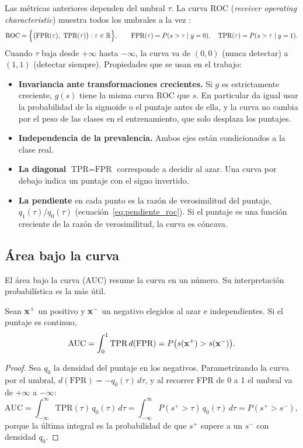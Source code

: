 Las métricas anteriores dependen del umbral $\tau$. La curva ROC (\emph{receiver operating characteristic}) muestra
todos los umbrales a la vez \parencite{fawcett2006}:
\begin{equation}
  \text{ROC} = \Big\{\big(\text{FPR}(\tau),\ \text{TPR}(\tau)\big) : \tau \in \R\Big\},
  \qquad
  \text{FPR}(\tau) = P(s > \tau \mid y = 0),\quad \text{TPR}(\tau) = P(s > \tau \mid y = 1).
\end{equation}
Cuando $\tau$ baja desde $+\infty$ hasta $-\infty$, la curva va de $(0,0)$ (nunca detectar) a $(1,1)$ (detectar
siempre). Propiedades que se usan en el trabajo:
\begin{itemize}
  \item \textbf{Invariancia ante transformaciones crecientes.} Si $g$ es estrictamente creciente, $g(s)$ tiene la misma
        curva ROC que $s$. En particular da igual usar la probabilidad de la sigmoide o el puntaje antes de ella, y
        la curva no cambia por el peso de las clases en el entrenamiento, que solo desplaza los puntajes.
  \item \textbf{Independencia de la prevalencia.} Ambos ejes están condicionados a la clase real.
  \item \textbf{La diagonal} $\text{TPR} = \text{FPR}$ corresponde a decidir al azar. Una curva por debajo indica un puntaje
        con el signo invertido.
  \item \textbf{La pendiente} en cada punto es la razón de verosimilitud del puntaje,
        $q_1(\tau)/q_0(\tau)$ (ecuación~\eqref{eq:pendiente_roc}). Si el puntaje es una función creciente de la razón de
        verosimilitud, la curva es cóncava.
\end{itemize}

\subsection{Área bajo la curva}

El área bajo la curva (AUC) resume la curva en un número. Su interpretación probabilística es la más útil.

\begin{proposicion}
\label{prop:auc}
Sean $\mathbf{x}^+$ un positivo y $\mathbf{x}^-$ un negativo elegidos al azar e independientes. Si el puntaje es continuo,
\begin{equation}
  \text{AUC} = \int_0^1 \text{TPR}\,d(\text{FPR}) = P\big(s(\mathbf{x}^+) > s(\mathbf{x}^-)\big).
\end{equation}
\end{proposicion}
\begin{proof}
Sea $q_0$ la densidad del puntaje en los negativos. Parametrizando la curva por el umbral,
$d(\text{FPR}) = -q_0(\tau)\,d\tau$, y al recorrer FPR de 0 a 1 el umbral va de $+\infty$ a $-\infty$:
\[
  \text{AUC} = \int_{-\infty}^{\infty} \text{TPR}(\tau)\,q_0(\tau)\,d\tau
  = \int_{-\infty}^{\infty} P(s^+ > \tau)\,q_0(\tau)\,d\tau
  = P(s^+ > s^-),
\]
porque la última integral es la probabilidad de que $s^+$ supere a un $s^-$ con densidad $q_0$.
\end{proof}

